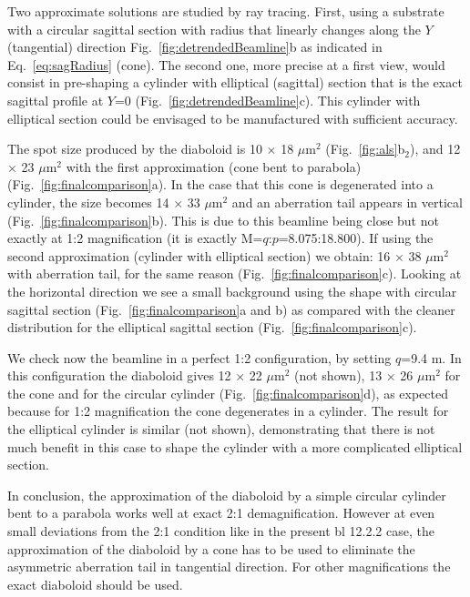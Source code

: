 \documentclass{iucr}              %
\begin{document}
Two approximate solutions are studied by ray tracing. First, using a substrate with a circular sagittal section with radius that linearly changes along the $Y$ (tangential) direction Fig.~\ref{fig:detrendedBeamline}b as indicated in Eq.~\ref{eq:sagRadius} (cone). The second one, more precise at a first view, would consist in pre-shaping a cylinder with elliptical (sagittal) section that is the exact sagittal profile at $Y$=0 (Fig.~\ref{fig:detrendedBeamline}c).  This cylinder with elliptical section could be envisaged to be manufactured with sufficient accuracy. 

The spot size produced by the diaboloid is 10 $\times$ 18 $\mu$m$^2$ (Fig.~\ref{fig:als}b$_2$), and 12 $\times$ 23 $\mu$m$^2$ with the first approximation (cone bent to parabola) (Fig.~\ref{fig:finalcomparison}a). In the case that this cone is degenerated into a cylinder, the size becomes 14 $\times$ 33 $\mu$m$^2$ and an aberration tail appears in vertical (Fig.~\ref{fig:finalcomparison}b). This is due to this beamline being close but not exactly at 1:2 magnification (it is exactly M=$q$:$p$=8.075:18.800). If using the second approximation (cylinder with elliptical section) we obtain: 16 $\times$ 38 $\mu$m$^2$ with aberration tail, for the same reason (Fig.~\ref{fig:finalcomparison}c). Looking at the horizontal direction we see a small background using the shape with circular sagittal section (Fig.~\ref{fig:finalcomparison}a and b) as compared with the cleaner distribution for the elliptical sagittal section (Fig.~\ref{fig:finalcomparison}c). 

We check now the beamline in a perfect 1:2 configuration, by setting $q$=9.4 m. In this configuration the diaboloid gives 12 $\times$ 22 $\mu$m$^2$ (not shown), 13 $\times$ 26 $\mu$m$^2$ for the cone and for the circular cylinder (Fig.~\ref{fig:finalcomparison}d), as expected because for 1:2 magnification the cone degenerates in a cylinder. The result for the elliptical cylinder is similar (not shown), demonstrating that there is not much benefit in this case to shape the cylinder with a more complicated elliptical section.   


In conclusion, the approximation of the diaboloid by a simple circular cylinder bent to a parabola works well at exact 2:1 demagnification. However at even small deviations from the 2:1 condition like in the present bl 12.2.2 case, the approximation of the diaboloid by a cone has to be used to eliminate the asymmetric aberration tail in tangential direction. For other magnifications the exact diaboloid should be used.
\end{document}
